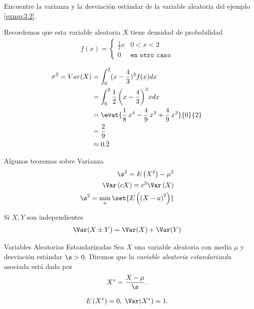  \begin{ejemplo} %
  \label{exmp:0.3.4}
  Encuentre la varianza y la desviación estándar de la variable aleatoria del ejemplo \ref{exmp:3.2}.
 \end{ejemplo}


{}
Recordemos que esta variable aleatoria $X$ tiene densidad de probabilidad
  \begin{align}
   f(x)=
   \begin{cases}
    \frac{1}{2}x & 0<x<2 \\
    0 & \texttt{en otro caso}
   \end{cases}
  \end{align}

{}
\begin{align}
 \sigma^2 = Var(X) &= \displaystyle \int_{0}^{2}(x-\frac{4}{3})^2f(x) dx
 \\  &= \displaystyle \int_{0}^{2} \frac{1}{2} \, {\left(x - \frac{4}{3}\right)}^{2} x dx
 \\  &= \displaystyle
 \evat{\frac{1}{8} \, x^{4} - \frac{4}{9} \, x^{3} + \frac{4}{9} \, x^{2}}{0}{2}
 \\  &= \displaystyle \frac{2}{9}
\\  &\approx \displaystyle 0.\bar{2}
\end{align}

{Algunos teoremas sobre Varianza}
\begin{align}
 \label{eq:0.3.16}
 \s^{2}=E\left( X^{2} \right)-\mu^{2} \\ 
 \label{eq:0.3.17}
 \Var\left( cX \right)=c^{2}\Var\left( X \right)\\ 
 \label{thm:0.3.6}
 \s^{2}=\min_{a}\set{E\left( \left( X-a \right)^{2} \right)}
\end{align}

Si $X,Y$ son independientes
\begin{align}
 \label{eq:0.3.18}
 \Var(X\pm Y)=\Var(X)+\Var(Y)
\end{align}


{Variables Aleatorias Estandarizadas}
 Sea $X$ una variable aleatoria con media $\mu$ y desviación estándar $\s>0.$ Diremos que la \emph{variable aleatoria estandarizada} asociada está dada por
 \begin{align}
  \label{eq:0.3.20}
  X^{*}=\dfrac{X-\mu}{\s}.
 \end{align}


\begin{align}
 \label{eq:0.3.21}
 E\left( X^{*} \right)=0, \; \Var(X^{*})=1.
\end{align}



